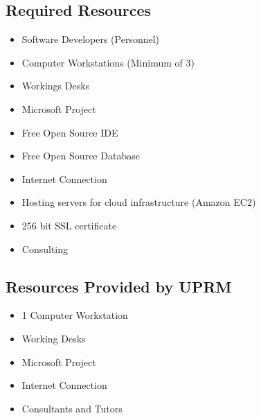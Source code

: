 
\subsection{Required Resources}
\begin{itemize}
\item Software Developers (Personnel)
\item Computer Workstations (Minimum of 3)
\item Workings Desks
\item Microsoft Project
\item Free Open Source IDE
\item Free Open Source Database
\item Internet Connection
\item Hosting servers for cloud infrastructure (Amazon EC2)
\item 256 bit SSL certificate
\item Consulting
\end{itemize}

\subsection{Resources Provided by UPRM}
\begin{itemize}
\item 1 Computer Workstation
\item Working Desks
\item Microsoft Project
\item Internet Connection
\item Consultants and Tutors

\end{itemize}
